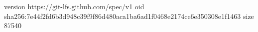 version https://git-lfs.github.com/spec/v1
oid sha256:7e44f2fd6b3d948c39f9f86d480aca1ba6ad1f0468e2174ce6e350308e1f1463
size 87540

